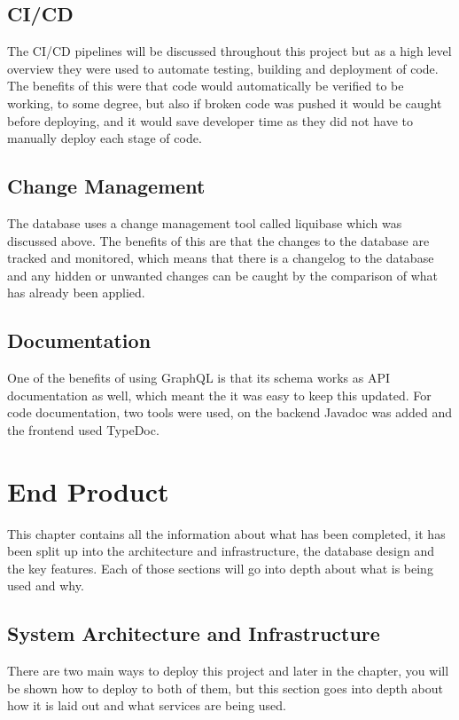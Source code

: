 \documentclass[]{project_report}
\begin{document}
\section{CI/CD}
The CI/CD pipelines will be discussed throughout this project but as a high level overview they were used to automate testing, building and deployment of code. The benefits of this were that code would automatically be verified to be working, to some degree, but also if broken code was pushed it would be caught before deploying, and it would save developer time as they did not have to manually deploy each stage of code.

\section{Change Management}
The database uses a change management tool called liquibase which was discussed above. The benefits of this are that the changes to the database are tracked and monitored, which means that there is a changelog to the database and any hidden or unwanted changes can be caught by the comparison of what has already been applied.

\section{Documentation}

One of the benefits of using GraphQL is that its schema works as API documentation as well, which meant the it was easy to keep this updated. For code documentation, two tools were used, on the backend Javadoc was added and the frontend used TypeDoc.

\chapter{End Product}
\label{chapter:endproduct}
This chapter contains all the information about what has been completed, it has been split up into the architecture and infrastructure, the database design and the key features. Each of those sections will go into depth about what is being used and why.

\section{System Architecture and Infrastructure}
There are two main ways to deploy this project and later in the  chapter, you will be shown how to deploy to both of them, but this section goes into depth about how it is laid out and what services are being used.
\end{document}
